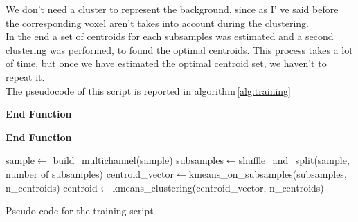 	
	We don't need a cluster to represent the background, since as I' ve said before the corresponding voxel aren't takes into account during the clustering.\\
	In the end a set of centroids for each subsamples was estimated and a second clustering was performed, to found the optimal centroids. 
	This process takes a lot of time, but once we have estimated the optimal centroid set, we haven't to repeat it.\\
	
	The pseudocode of this script is reported in algorithm\,\ref{alg:training}
		
		
	\begin{algorithm}
	
	\SetAlgoLined
	\DontPrintSemicolon
	
	
	\textbf{End Function}

	\textbf{End Function}
	
	

	sample$\leftarrow$ build\_multichannel(sample)\;
	subsamples$\leftarrow$shuffle\_and\_split(sample, number of subsamples)\;
	centroid\_vector$\leftarrow$kmeans\_on\_subsamples(subsamples, n\_centroids)\;
	centroid$\leftarrow$kmeans\_clustering(centroid\_vector, n\_centroids)\;
	
	\caption{Pseudo-code for the training script}\label{alg:training}
	
\end{algorithm}

	
